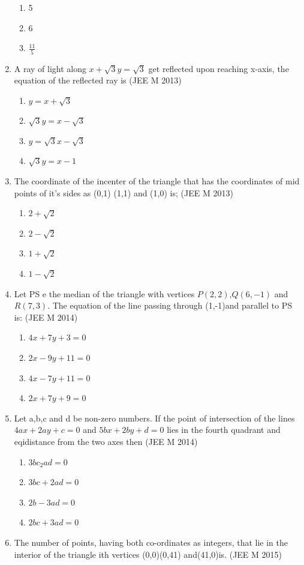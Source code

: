 \documentclass[12pt]{article}
\begin{document}
\begin{enumerate}
\begin{enumerate}
\item 5 
\item 6 
\item $\frac{11}{5}$
\end{enumerate}
\item A ray of light along $x+\sqrt{3}y=\sqrt{3}$ get reflected upon reaching x-axis, the equation of the reflected ray is (JEE M 2013)
\begin{enumerate}
\item $y=x+\sqrt{3}$ 
\item $\sqrt{3}y=x-\sqrt{3}$ 
\item $y=\sqrt{3}x-\sqrt{3}$ 
\item $\sqrt{3}y=x-1$ 
\end{enumerate}
\item The coordinate of the incenter of the triangle that has the coordinates of mid points of it's sides as (0,1) (1,1) and (1,0) is; (JEE M 2013)
\begin{enumerate}
\item $2+\sqrt{2}$
\item $2-\sqrt{2}$ 
\item $1+\sqrt{2}$ 
\item $1-\sqrt{2}$
\end{enumerate}
\item Let PS e the median of the triangle with vertices $P(2,2)$,$Q(6,-1)$ and $R(7,3)$. The equation of the line passing through (1,-1)and parallel to PS is: (JEE M 2014)
\begin{enumerate}
\item $4x+7y+3=0$ 
\item $2x-9y+11=0$ 
\item $4x-7y+11=0$ 
\item $2x+7y+9=0$ 
\end{enumerate}
\item Let a,b,c and d be non-zero numbers. If the point of intersection of the lines $4ax+2ay+c=0$ and $5bx+2by+d=0$ lies in the fourth quadrant and eqidistance from the two axes then (JEE M 2014)
\begin{enumerate}
\item $3bc_2ad=0$  
\item $3bc+2ad=0$
\item $2b-3ad=0$ 
\item $2bc+3ad=0$
\end{enumerate}
\item The number of points, having both co-ordinates as integers, that lie in the interior of the triangle ith vertices (0,0)(0,41) and(41,0)is. (JEE M 2015)

\end{enumerate}
\end{document}
